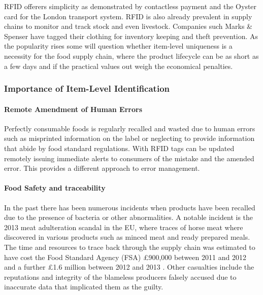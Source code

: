 \documentclass[a4paper, 11pt]{article}
\begin{document}
RFID offerers simplicity as demonstrated by contactless payment and the Oyster card for the London transport system. RFID is also already prevalent in supply chains to monitor and track stock and even livestock. Companies such Marks \& Spenser have tagged their clothing for inventory keeping and theft prevention. As the popularity rises some will question whether item-level uniqueness is a necessity for the food supply chain, where the product lifecycle can be as short as a few days and if the practical values out weigh the economical penalties. 

\vspace{\baselineskip}
\vspace{\baselineskip}
\vspace{\baselineskip}

\subsubsection{Importance of Item-Level Identification}

\paragraph{Remote Amendment of Human Errors}
Perfectly consumable foods is regularly recalled and wasted due to human errors such as misprinted information on the label or neglecting to provide information that abide by food standard regulations. With RFID tags can be updated remotely issuing immediate alerts to consumers of the mistake and the amended error. This provides a different approach to error management.

\paragraph{Food Safety and traceability}
In the past there has been numerous incidents when products have been recalled due to the presence of bacteria or other abnormalities. A notable incident is the 2013 meat adulteration scandal in the EU, where traces of horse meat where discovered in various products such as minced meat and ready prepared meals. The time and resources to trace back through the supply chain was estimated to have cost the Food Standard Agency (FSA) \pounds900,000 between 2011 and 2012 and a further \pounds1.6 million between 2012 and 2013 \cite{3}. Other casualties include the reputations and integrity of the blameless producers falsely accused due to inaccurate data that implicated them as the guilty.\cite{horsy}
\end{document}
